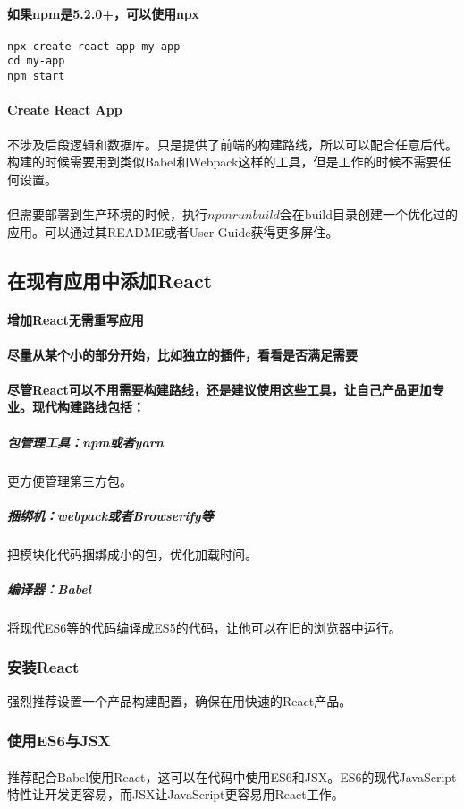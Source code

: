 \documentclass{book}
\begin{document}
\begin{CJK*}{UTF8}{gbsn}
\paragraph{如果npm是5.2.0+，可以使用npx}
\begin{verbatim}
npx create-react-app my-app
cd my-app
npm start
\end{verbatim}
\paragraph{Create React App}不涉及后段逻辑和数据库。只是提供了前端的构建路线，所以可以配合任意后代。构建的时候需要用到类似Babel和Webpack这样的工具，但是工作的时候不需要任何设置。
\paragraph{}但需要部署到生产环境的时候，执行$ npm run build $会在build目录创建一个优化过的应用。可以通过其README或者User Guide获得更多屏住。
\subsection{在现有应用中添加React}
\paragraph{增加React无需重写应用}
\paragraph{尽量从某个小的部分开始，比如独立的插件，看看是否满足需要}
\paragraph{尽管React可以不用需要构建路线，还是建议使用这些工具，让自己产品更加专业。现代构建路线包括：}
\subparagraph{包管理工具：npm或者yarn}更方便管理第三方包。
\subparagraph{捆绑机：webpack或者Browserify等}把模块化代码捆绑成小的包，优化加载时间。
\subparagraph{编译器：Babel}将现代ES6等的代码编译成ES5的代码，让他可以在旧的浏览器中运行。
\subsubsection{安装React}
强烈推荐设置一个产品构建配置，确保在用快速的React产品。
\subsubsection{使用ES6与JSX}
\paragraph{}推荐配合Babel使用React，这可以在代码中使用ES6和JSX。ES6的现代JavaScript特性让开发更容易，而JSX让JavaScript更容易用React工作。

\end{CJK*}
\end{document}
